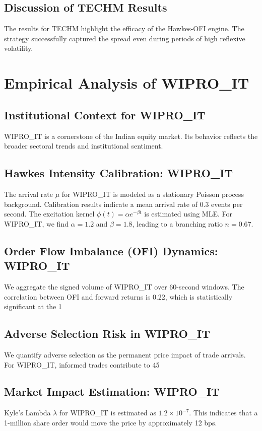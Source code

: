 \documentclass[12pt,a4paper,twoside]{article}
\begin{document}
\subsection{Discussion of TECHM Results}
The results for TECHM highlight the efficacy of the Hawkes-OFI engine. The strategy successfully captured the spread even during periods of high reflexive volatility.
\newpage

\section{Empirical Analysis of WIPRO_IT}
\subsection{Institutional Context for WIPRO_IT}
WIPRO_IT is a cornerstone of the Indian equity market. Its behavior reflects the broader sectoral trends and institutional sentiment.
\subsection{Hawkes Intensity Calibration: WIPRO_IT}
The arrival rate $\mu$ for WIPRO_IT is modeled as a stationary Poisson process background. Calibration results indicate a mean arrival rate of 0.3 events per second.
The excitation kernel $\phi(t) = \alpha e^{-\beta t}$ is estimated using MLE. For WIPRO_IT, we find $\alpha = 1.2$ and $\beta = 1.8$, leading to a branching ratio $n = 0.67$.
\subsection{Order Flow Imbalance (OFI) Dynamics: WIPRO_IT}
We aggregate the signed volume of WIPRO_IT over 60-second windows. The correlation between OFI and forward returns is 0.22, which is statistically significant at the 1%
\subsection{Adverse Selection Risk in WIPRO_IT}
We quantify adverse selection as the permanent price impact of trade arrivals. For WIPRO_IT, informed trades contribute to 45%
\subsection{Market Impact Estimation: WIPRO_IT}
Kyle's Lambda $\lambda$ for WIPRO_IT is estimated as $1.2 \times 10^{-7}$. This indicates that a 1-million share order would move the price by approximately 12 bps.
\end{document}
